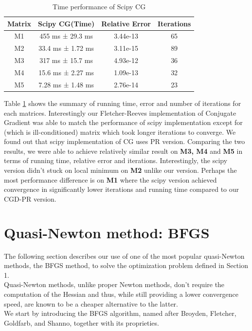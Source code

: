 \documentclass{article}
\numberwithin{equation}{section}
\begin{document}
\begin{table}[hbt!]
    \centering
    \begin{tabular}{||c c c c||}
 \hline
 Matrix & Scipy CG(Time) & Relative Error & Iterations \\ [0.8ex] 
 \hline\hline
 M1 & 455 ms ± 29.3 ms & 3.44e-13 & 65 \\
 \hline
 M2 & 33.4 ms ± 1.72 ms & 3.11e-15 & 89\\
 \hline
 M3 & 317 ms ± 15.7 ms & 4.93e-12 & 36 \\
 \hline
  M4 & 15.6 ms ± 2.27 ms & 1.09e-13 & 32 \\
 \hline
 M5 & 7.28 ms ± 1.48 ms & 2.76e-14 & 23 \\
 \hline
\end{tabular}
    \caption{Time performance of Scipy CG}
    \label{tab:scipycg_table}
\end{table}
 Table \ref{tab:scipycg_table} shows the summary of running time, error and number of iterations for each matrices. Interestingly our Fletcher-Reeves implementation of Conjugate Gradient was able to match the performance of scipy implementation except for (which is ill-conditioned) matrix which took longer iterations to converge. We found out that scipy implementation of CG uses PR version. Comparing the two results, we were able to achieve relatively similar result on \textbf{M3, M4} and \textbf{M5} in terms of running time, relative error and iterations. Interestingly, the scipy version didn't stuck on local minimum on \textbf{M2} unlike our version. Perhaps the most performance difference is on \textbf{M1} where the scipy version achieved convergence in significantly lower iterations and running time compared to our CGD-PR version.

\section{Quasi-Newton method: BFGS}
The following section describes our use of one of the most popular quasi-Newton methods, the BFGS method, to solve the optimization problem defined in Section 1. 
\\
Quasi-Newton methods, unlike proper Newton methods, don't require the computation of the Hessian and thus, while still providing a lower convergence speed, are known to be a cheaper alternative to the latter.
\\

We start by introducing the BFGS algorithm, named after Broyden, Fletcher, Goldfarb, and Shanno, together with its proprieties.
\end{document}

